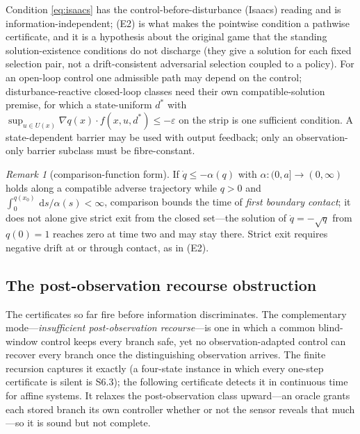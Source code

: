 \documentclass[11pt,a4paper]{article}
\theoremstyle{plain}
\theoremstyle{definition}
\theoremstyle{remark}
\newtheorem{remark}[theorem]{Remark}
\newcommand{\dd}{\,\mathrm{d}}
\newcommand{\hyp}[1]{\textup{(#1)}}
\begin{document}
Condition \eqref{eq:isaacs} has the control-before-disturbance (Isaacs) reading and is information-independent; \hyp{E2} is what makes the pointwise condition a pathwise certificate, and it is a hypothesis about the original game that the standing solution-existence conditions do not discharge (they give a solution for each fixed selection pair, not a drift-consistent adversarial selection coupled to a policy). For an open-loop control one admissible path may depend on the control; disturbance-reactive closed-loop classes need their own compatible-solution premise, for which a state-uniform $d^*$ with $\sup_{u\in U(x)}\nabla q(x)\cdot f(x,u,d^*)\le-\varepsilon$ on the strip is one sufficient condition. A state-dependent barrier may be used with output feedback; only an observation-only barrier subclass must be fibre-constant.

\begin{remark}[comparison-function form]\label{rem:comparison}
If $\dot q\le-\alpha(q)$ with $\alpha:(0,a]\to(0,\infty)$ holds along a compatible adverse trajectory while $q>0$ and $\int_0^{q(x_0)}\dd s/\alpha(s)<\infty$, comparison bounds the time of \emph{first boundary contact}; it does not alone give strict exit from the closed set---the solution of $\dot q=-\sqrt q$ from $q(0)=1$ reaches zero at time two and may stay there. Strict exit requires negative drift at or through contact, as in \hyp{E2}.
\end{remark}

\subsection{The post-observation recourse obstruction}\label{sec:recourse}

The certificates so far fire before information discriminates. The complementary mode---\emph{insufficient post-observation recourse}---is one in which a common blind-window control keeps every branch safe, yet no observation-adapted control can recover every branch once the distinguishing observation arrives. The finite recursion captures it exactly (a four-state instance in which every one-step certificate is silent is S6.3); the following certificate detects it in continuous time for affine systems. It relaxes the post-observation class upward---an oracle grants each stored branch its own controller whether or not the sensor reveals that much---so it is sound but not complete.
\end{document}

